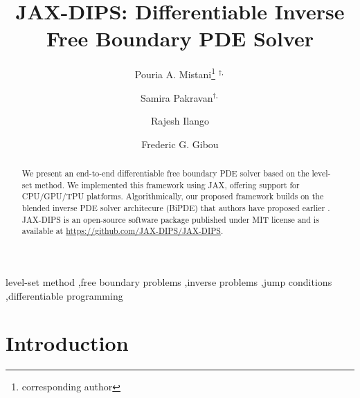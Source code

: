 \documentclass{elsarticle}
\begin{document}
\title{JAX-DIPS: Differentiable Inverse Free Boundary PDE Solver}



\author[1]{Pouria A. Mistani\thanks{corresponding author} $^{\dagger,}$}
\author[2]{Samira Pakravan$^{\dagger,}$}
\author[1]{Rajesh Ilango}
\author[2]{Frederic G. Gibou}

\address[1]{NVIDIA Corporation, Santa Clara, CA 95051, USA}
\address[2]{Department of Mechanical Engineering, University of California, Santa Barbara, CA 93106-5070, USA}

\begin{abstract}
We present an end-to-end differentiable free boundary PDE solver based on the level-set method. We implemented this framework using JAX, offering support for CPU/GPU/TPU platforms. Algorithmically, our proposed framework builds on the blended inverse PDE solver architecure (BiPDE) that authors have proposed earlier \cite{pakravan2021solving}. JAX-DIPS is an open-source software package published under MIT license and is available at \href{https://github.com/JAX-DIPS/JAX-DIPS}{https://github.com/JAX-DIPS/JAX-DIPS}.

\end{abstract}

\begin{keyword}
level-set method \sep free boundary problems \sep inverse problems \sep jump conditions \sep differentiable programming 
\end{keyword}

\maketitle
\def\thefootnote{$\dagger$}







\section{Introduction}
\label{sec::introduction}
\end{document}
